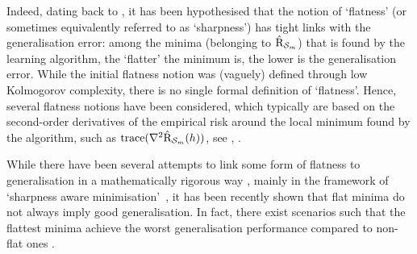 Indeed, dating back to \citet{hochreiter1997flat}, it has been hypothesised that the notion of `flatness' (or sometimes equivalently referred to as `sharpness') has tight links with the generalisation error: among the minima (belonging to $\hat{\text{R}}_{\mathcal{S}_m}$) that is found by the learning algorithm, the `flatter' the minimum is, the lower is the generalisation error.
While the initial flatness notion was (vaguely) defined through low Kolmogorov complexity, there is no single formal definition of `flatness'.
Hence, several flatness notions have been considered, which typically are based on the second-order derivatives of the empirical risk around the local minimum found by the algorithm, such as $\mathrm{trace}(\nabla^2 \hat{\text{R}}_{\mathcal{S}_m}(h))$, see \eg, \citet{jastrzkebski2017three, wen2023sharpness}.


While there have been several attempts to link some form of flatness to generalisation in a mathematically rigorous way \citep{neyshabur2017explor,petzka2021relative,yue2023sharpness, andriushchenko2023modern}, mainly in the framework of `sharpness aware minimisation'~\citep{foret2020sharpness}, it has been recently shown that flat minima do not always imply good generalisation.
In fact, there exist scenarios such that the flattest minima achieve the worst generalisation performance compared to non-flat ones \citep{wen2023sharpness}. 


